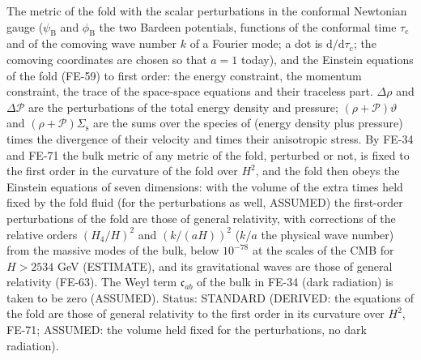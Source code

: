 \documentclass[
  10pt,
]{article}
\begin{document}
The metric of the fold with the scalar perturbations in the conformal
Newtonian gauge (\(\psi_{\mathrm{B}}\) and \(\phi_{\mathrm{B}}\) the two
Bardeen potentials, functions of the conformal time
\(\tau_{\mathrm{c}}\) and of the comoving wave number \(k\) of a Fourier
mode; a dot is \(\mathrm{d}/\mathrm{d}\tau_{\mathrm{c}}\); the comoving
coordinates are chosen so that \(a = 1\) today), and the Einstein
equations of the fold (FE-59) to first order: the energy constraint, the
momentum constraint, the trace of the space-space equations and their
traceless part. \(\Delta\rho\) and \(\Delta\mathcal{P}\) are the
perturbations of the total energy density and pressure;
\((\rho + \mathcal{P})\vartheta\) and
\((\rho + \mathcal{P})\Sigma_{\mathrm{s}}\) are the sums over the
species of (energy density plus pressure) times the divergence of their
velocity and times their anisotropic stress. By FE-34 and FE-71 the bulk
metric of any metric of the fold, perturbed or not, is fixed to the
first order in the curvature of the fold over \(H^2\), and the fold then
obeys the Einstein equations of seven dimensions: with the volume of the
extra times held fixed by the fold fluid (for the perturbations as well,
ASSUMED) the first-order perturbations of the fold are those of general
relativity, with corrections of the relative orders \((H_4/H)^2\) and
\((k/(aH))^2\) (\(k/a\) the physical wave number) from the massive modes
of the bulk, below \(10^{-78}\) at the scales of the CMB for
\(H > 2534\) GeV (ESTIMATE), and its gravitational waves are those of
general relativity (FE-63). The Weyl term \(\mathfrak{c}_{ab}\) of the
bulk in FE-34 (dark radiation) is taken to be zero (ASSUMED). Status:
STANDARD (DERIVED: the equations of the fold are those of general
relativity to the first order in its curvature over \(H^2\), FE-71;
ASSUMED: the volume held fixed for the perturbations, no dark
radiation).
\end{document}
